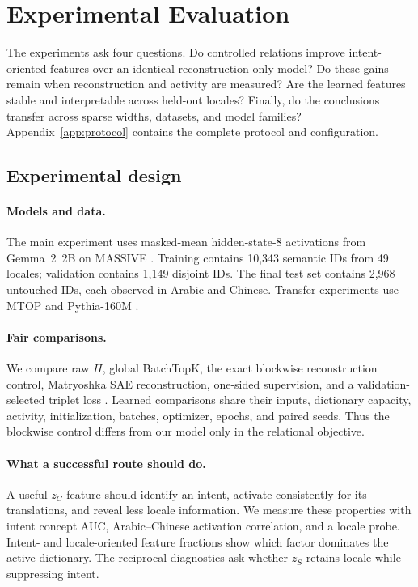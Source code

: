 \section{Experimental Evaluation}
\label{sec:experiments}

The experiments ask four questions. Do controlled relations improve intent-oriented features over an identical reconstruction-only model? Do these gains remain when reconstruction and activity are measured? Are the learned features stable and interpretable across held-out locales? Finally, do the conclusions transfer across sparse widths, datasets, and model families? Appendix~\ref{app:protocol} contains the complete protocol and configuration.

\subsection{Experimental design}

\paragraph{Models and data.}
The main experiment uses masked-mean hidden-state-8 activations from Gemma~2~2B \citep{gemmateam2024gemma2} on MASSIVE \citep{fitzgerald2023massive}. Training contains 10,343 semantic IDs from 49 locales; validation contains 1,149 disjoint IDs. The final test set contains 2,968 untouched IDs, each observed in Arabic and Chinese. Transfer experiments use MTOP \citep{li2021mtop} and Pythia-160M \citep{biderman2023pythia}.

\paragraph{Fair comparisons.}
We compare raw $H$, global BatchTopK, the exact blockwise reconstruction control, Matryoshka SAE reconstruction, one-sided supervision, and a validation-selected triplet loss \citep{schroff2015facenet}. Learned comparisons share their inputs, dictionary capacity, activity, initialization, batches, optimizer, epochs, and paired seeds. Thus the blockwise control differs from our model only in the relational objective.

\paragraph{What a successful route should do.}
A useful $z_C$ feature should identify an intent, activate consistently for its translations, and reveal less locale information. We measure these properties with intent concept AUC, Arabic--Chinese activation correlation, and a locale probe. Intent- and locale-oriented feature fractions show which factor dominates the active dictionary. The reciprocal diagnostics ask whether $z_S$ retains locale while suppressing intent.

